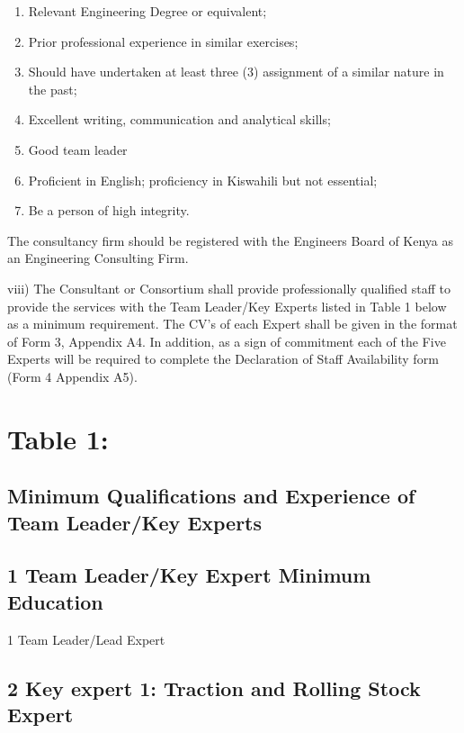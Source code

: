 \begin{enumerate}

	\item	Relevant Engineering Degree or equivalent;
	\item	Prior professional experience in similar exercises;
	\item	Should have undertaken at least three (3) assignment of a similar 	nature in the past;
	\item	Excellent writing, communication and analytical skills;
	\item	Good team leader
	\item	Proficient in English; proficiency in Kiswahili but not essential;
	\item	Be a person of high integrity.
\end{enumerate}


The consultancy firm should be registered with the Engineers Board of
	Kenya as an Engineering Consulting Firm.


viii) The Consultant or Consortium shall provide professionally qualified
staff to provide the services with the Team Leader/Key Experts listed in
Table 1 below as a minimum requirement. The CV's of each Expert shall be
given in the format of Form 3, Appendix A4. In addition, as a sign of
commitment each of the Five Experts will be required to complete the
Declaration of Staff Availability form (Form 4 Appendix A5).

\section{Table 1:}\label{table-1}

\subsection{Minimum Qualifications and Experience of Team Leader/Key
	Experts}\label{minimum-qualifications-and-experience-of-team-leaderkey-experts}

\subsection{1 Team Leader/Key Expert Minimum
	Education}\label{team-leaderkey-expert-minimum-education}

1 Team Leader/Lead Expert

\subsection{2 Key expert 1: Traction and Rolling Stock
	Expert}\label{key-expert-1-traction-and-rolling-stock-expert}

